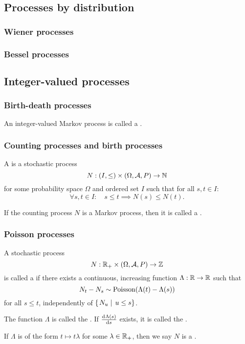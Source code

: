 \subsection{Processes by distribution}
\subsubsection{Wiener processes}
\subsubsection{Bessel processes}

\subsection{Integer-valued processes}
\subsubsection{Birth-death processes}
\begin{definition}
An integer-valued Markov process is called a .
\end{definition}

\subsubsection{Counting processes and birth processes}
\begin{definition}
A  is a stochastic process
\[ N: \left( I,\leq \right)\times \left( \Omega, \mathcal{A}, P \right) \to \mathbb{N} \]
for some probability space $\Omega$ and ordered set $I$ such that for all $s,t\in I$:
\[ \forall s,t\in I: \quad s\leq t \implies N(s)\leq N(t). \]

If the counting process $N$ is a Markov process, then it is called a .
\end{definition}

\subsubsection{Poisson processes}
\begin{definition}
A stochastic process
\[ N: \mathbb{R}_+\times \left( \Omega, \mathcal{A}, P \right) \to \mathbb{Z} \]
is called a  if there exists a continuous, increasing function $\Lambda: \mathbb{R}\to \mathbb{R}$ such that
\[ N_t - N_s \sim \operatorname{Poisson}(\Lambda(t) - \Lambda(s)) \]
for all $s\leq t$, independently of $\left\{\left. N_u \;\right|\; u\leq s \right\}$.

The function $\Lambda$ is called the . If $\od{\Lambda(s)}{s}$ exists, it is called the .

If $\Lambda$ is of the form $t\mapsto t\lambda$ for some $\lambda \in \mathbb{R}_+$, then we say $N$ is a .
\end{definition}

